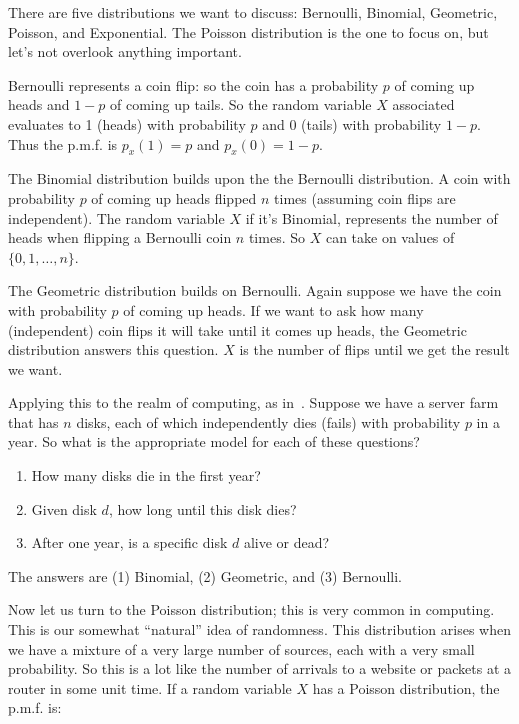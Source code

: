 There are five distributions we want to discuss: Bernoulli, Binomial, Geometric, Poisson, and Exponential. The Poisson distribution is the one to focus on, but let's not overlook anything important.

Bernoulli represents a coin flip: so the coin has a probability $p$ of coming up heads and $1-p$ of coming up tails. So the random variable $X$ associated evaluates to 1 (heads) with probability $p$ and 0 (tails) with probability $1-p$. Thus the p.m.f. is $p_{x}(1) = p$ and $p_{x}(0) = 1 - p$. 

The Binomial distribution builds upon the the Bernoulli distribution. A coin with probability $p$ of coming up heads flipped $n$ times (assuming coin flips are independent). The random variable $X$ if it's Binomial, represents the number of heads when flipping a Bernoulli coin $n$ times. So $X$ can take on values of $\{0, 1, \ldots, n\}$. 

The Geometric distribution builds on Bernoulli. Again suppose we have the coin with probability $p$ of coming up heads. If we want to ask how many (independent) coin flips it will take until it comes up heads, the Geometric distribution answers this question. $X$ is the number of flips until we get the result we want.

Applying this to the realm of computing, as in~\cite{pmd}. Suppose we have a server farm that has $n$ disks, each of which independently dies (fails) with probability $p$ in a year. So what is the appropriate model for each of these questions?

\begin{enumerate}
	\item How many disks die in the first year?
	\item Given disk $d$, how long until this disk dies?
	\item After one year, is a specific disk $d$ alive or dead?
\end{enumerate}

The answers are (1) Binomial, (2) Geometric, and (3) Bernoulli.

Now let us turn to the Poisson distribution; this is very common in computing. This is our somewhat ``natural'' idea of randomness. This distribution arises when we have a mixture of a very large number of sources, each with a very small probability. So this is a lot like the number of arrivals to a website or packets at a router in some unit time. If a random variable $X$ has a Poisson distribution, the p.m.f. is:

